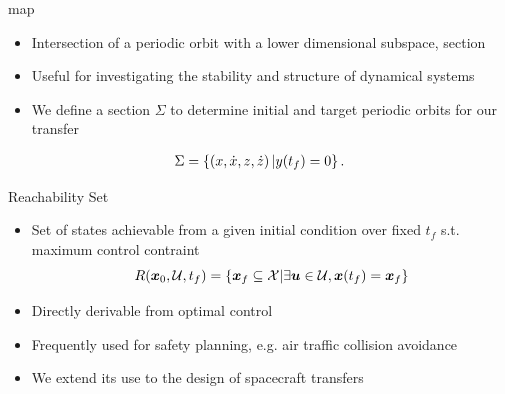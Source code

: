 \documentclass[11pt,professionalfonts]{beamer}
\begin{document}
\begin{frame}{\Poincare map}
\begin{itemize}
    \item Intersection of a periodic orbit with a lower dimensional subspace, \Poincare section
    \item Useful for investigating the stability and structure of dynamical systems
    \item We define a section \( \Sigma \) to determine initial and target periodic orbits for our transfer
\end{itemize}

\begin{align}\label{eq:poincare_section}
    \Sigma = \left\{ \left( x, \dot{x}, z, \dot{z} \right) | y(t_f) = 0  \right\}.
\end{align}

\end{frame}

\begin{frame}{Reachability Set}

\begin{itemize}
    \item Set of states achievable from a given initial condition over fixed \( t_f \) s.t. maximum control contraint
    \[
    R( \bm{x}_0, \mathcal{U} , t_f) = \left\{  \bm{x}_f \subseteq \mathcal{X} | \exists \bm{u} \in \mathcal{U}, \bm{x}(t_f) = \bm{x}_f  \right\}
    \]
    \item Directly derivable from optimal control
    \item Frequently used for safety planning, e.g. air traffic collision avoidance
    \item We extend its use to the design of spacecraft transfers
\end{itemize}

\end{frame}
\end{document}
